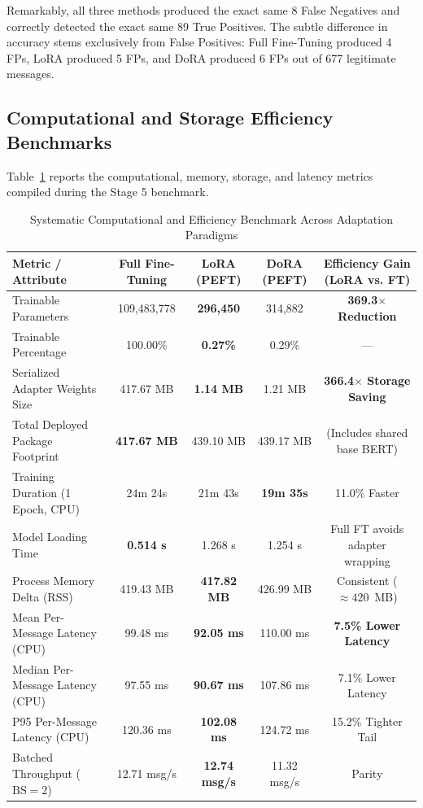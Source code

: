 \documentclass[conference]{IEEEtran}
\begin{document}
Remarkably, all three methods produced the exact same 8 False Negatives and correctly detected the exact same 89 True Positives. The subtle difference in accuracy stems exclusively from False Positives: Full Fine-Tuning produced 4 FPs, LoRA produced 5 FPs, and DoRA produced 6 FPs out of 677 legitimate messages.

\subsection{Computational and Storage Efficiency Benchmarks}
Table~\ref{tab:results_efficiency} reports the computational, memory, storage, and latency metrics compiled during the Stage 5 benchmark.

\begin{table}[htbp]
\caption{Systematic Computational and Efficiency Benchmark Across Adaptation Paradigms}
\label{tab:results_efficiency}
\centering
\begin{tabular}{lcccc}
\toprule
\textbf{Metric / Attribute} & \textbf{Full Fine-Tuning} & \textbf{LoRA (PEFT)} & \textbf{DoRA (PEFT)} & \textbf{Efficiency Gain (LoRA vs. FT)} \\
\midrule
Trainable Parameters & 109,483,778 & \textbf{296,450} & 314,882 & \textbf{369.3$\times$ Reduction} \\
Trainable Percentage & 100.00\% & \textbf{0.27\%} & 0.29\% & --- \\
Serialized Adapter Weights Size & 417.67 MB & \textbf{1.14 MB} & 1.21 MB & \textbf{366.4$\times$ Storage Saving} \\
Total Deployed Package Footprint & \textbf{417.67 MB} & 439.10 MB & 439.17 MB & (Includes shared base BERT) \\
Training Duration (1 Epoch, CPU) & 24m 24s & 21m 43s & \textbf{19m 35s} & 11.0\% Faster \\
Model Loading Time & \textbf{0.514 s} & 1.268 s & 1.254 s & Full FT avoids adapter wrapping \\
Process Memory Delta (RSS) & 419.43 MB & \textbf{417.82 MB} & 426.99 MB & Consistent ($\approx 420$~MB) \\
Mean Per-Message Latency (CPU) & 99.48 ms & \textbf{92.05 ms} & 110.00 ms & \textbf{7.5\% Lower Latency} \\
Median Per-Message Latency (CPU) & 97.55 ms & \textbf{90.67 ms} & 107.86 ms & 7.1\% Lower Latency \\
P95 Per-Message Latency (CPU) & 120.36 ms & \textbf{102.08 ms} & 124.72 ms & 15.2\% Tighter Tail \\
Batched Throughput ($\text{BS}=2$) & 12.71 msg/s & \textbf{12.74 msg/s} & 11.32 msg/s & Parity \\
\bottomrule
\end{tabular}
\end{table}
\end{document}
